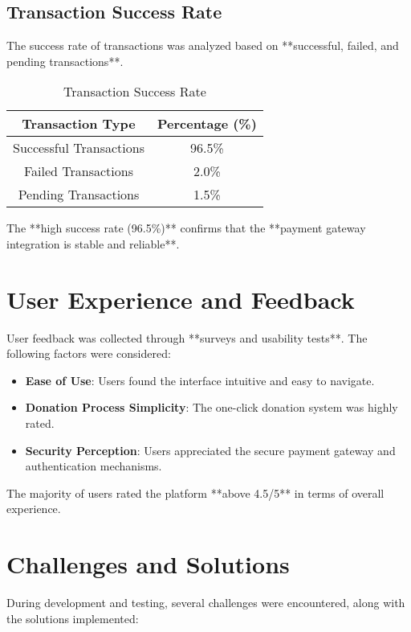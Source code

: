 \subsection{Transaction Success Rate}
The success rate of transactions was analyzed based on **successful, failed, and pending transactions**.

\begin{table}[h]
    \centering
    \begin{tabular}{|c|c|}
        \hline
        \textbf{Transaction Type} & \textbf{Percentage (\%)} \\
        \hline
        Successful Transactions & 96.5\% \\
        Failed Transactions & 2.0\% \\
        Pending Transactions & 1.5\% \\
        \hline
    \end{tabular}
    \caption{Transaction Success Rate}
    \label{table:transaction_success}
\end{table}

The **high success rate (96.5\%)** confirms that the **payment gateway integration is stable and reliable**.

\section{User Experience and Feedback}
User feedback was collected through **surveys and usability tests**. The following factors were considered:

\begin{itemize}
    \item \textbf{Ease of Use}: Users found the interface intuitive and easy to navigate.
    \item \textbf{Donation Process Simplicity}: The one-click donation system was highly rated.
    \item \textbf{Security Perception}: Users appreciated the secure payment gateway and authentication mechanisms.
\end{itemize}

The majority of users rated the platform **above 4.5/5** in terms of overall experience.

\section{Challenges and Solutions}
During development and testing, several challenges were encountered, along with the solutions implemented:

